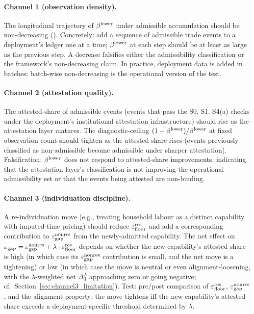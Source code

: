 \paragraph{Channel 1 (observation density).}
The longitudinal trajectory of $\beta^{\mathrm{lower}}$ under admissible
accumulation should be non-decreasing
(\citep[Propositions~2~and~3]{lasser2026paper8a}).  Concretely:
add a sequence of admissible trade events to a deployment's
ledger one at a time; $\beta^{\mathrm{lower}}$ at each step should be at least
as large as the previous step.  A decrease falsifies either the
admissibility classification or the framework's
non-decreasing claim.  In practice, deployment data is added
in batches; batch-wise non-decreasing is the operational
version of the test.

\paragraph{Channel 2 (attestation quality).}
The attested-share of admissible events (events that pass the
S0, S1, S4(a) checks under the deployment's institutional
attestation infrastructure) should rise as the attestation
layer matures.  The diagnostic-ceiling
$(1 - \beta^{\mathrm{lower}})/\beta^{\mathrm{lower}}$ at fixed observation count should
tighten as the attested share rises (events previously
classified as non-admissible become admissible under sharper
attestation).  Falsification: $\beta^{\mathrm{lower}}$ does not respond to
attested-share improvements, indicating that the attestation
layer's classification is not improving the operational
admissibility set or that the events being attested are
non-binding.

\paragraph{Channel 3 (individuation discipline).}
A re-individuation move (e.g., treating household labour as a
distinct capability with imputed-time pricing) should reduce
$\varepsilon_{\mathrm{floor}}^{\mathrm{res}}$ and add a corresponding contribution to
$\varepsilon_{\mathrm{gap}}^{\mathrm{nonres}}$ from the newly-admitted capability.  The net
effect on $\varepsilon_{\mathrm{gap}} = \varepsilon_{\mathrm{gap}}^{\mathrm{nonres}} + \lambda \cdot \varepsilon_{\mathrm{floor}}^{\mathrm{res}}$
depends on whether the new capability's attested share is
high (in which case its $\varepsilon_{\mathrm{gap}}^{\mathrm{nonres}}$ contribution is small,
and the net move is a tightening) or low (in which case the
move is neutral or even alignment-loosening, with the
$\lambda$-weighted net $\Delta_3^{\lambda}$ approaching zero
or going negative; cf.\ Section~\ref{sec:channel3_limitation}).
Test: pre/post comparison of $\varepsilon_{\mathrm{floor}}^{\mathrm{res}}$, $\varepsilon_{\mathrm{gap}}^{\mathrm{nonres}}$, and
the alignment property; the move tightens iff the new
capability's attested share exceeds a deployment-specific
threshold determined by $\lambda$.

